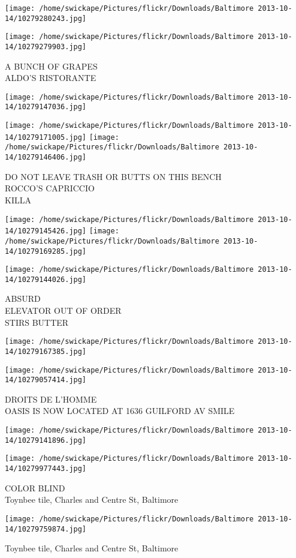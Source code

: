 \documentclass[10pt,letterpaper]{article}
\begin{document}
\texttt{[image: /home/swickape/Pictures/flickr/Downloads/Baltimore 2013-10-14/10279280243.jpg]}

\vspace{0.25in}
\texttt{[image: /home/swickape/Pictures/flickr/Downloads/Baltimore 2013-10-14/10279279903.jpg]}

A BUNCH OF GRAPES\\
ALDO'S RISTORANTE\\
\pagebreak

\texttt{[image: /home/swickape/Pictures/flickr/Downloads/Baltimore 2013-10-14/10279147036.jpg]}

\vspace{0.25in}
\texttt{[image: /home/swickape/Pictures/flickr/Downloads/Baltimore 2013-10-14/10279171005.jpg]}
\texttt{[image: /home/swickape/Pictures/flickr/Downloads/Baltimore 2013-10-14/10279146406.jpg]}

DO NOT LEAVE TRASH OR BUTTS ON THIS BENCH\\
ROCCO'S CAPRICCIO\\
KILLA\\
\pagebreak

\texttt{[image: /home/swickape/Pictures/flickr/Downloads/Baltimore 2013-10-14/10279145426.jpg]}
\texttt{[image: /home/swickape/Pictures/flickr/Downloads/Baltimore 2013-10-14/10279169285.jpg]}

\texttt{[image: /home/swickape/Pictures/flickr/Downloads/Baltimore 2013-10-14/10279144026.jpg]}

ABSURD\\
ELEVATOR OUT OF ORDER\\
STIRS BUTTER\\
\pagebreak

\texttt{[image: /home/swickape/Pictures/flickr/Downloads/Baltimore 2013-10-14/10279167385.jpg]}

\vspace{0.25in}
\texttt{[image: /home/swickape/Pictures/flickr/Downloads/Baltimore 2013-10-14/10279057414.jpg]}

DROITS DE L'HOMME\\
OASIS IS NOW LOCATED AT 1636 GUILFORD AV SMILE\\
\pagebreak

\texttt{[image: /home/swickape/Pictures/flickr/Downloads/Baltimore 2013-10-14/10279141896.jpg]}

\vspace{0.25in}
\texttt{[image: /home/swickape/Pictures/flickr/Downloads/Baltimore 2013-10-14/10279977443.jpg]}

COLOR BLIND\\
Toynbee tile, Charles and Centre St, Baltimore\\
\pagebreak

\texttt{[image: /home/swickape/Pictures/flickr/Downloads/Baltimore 2013-10-14/10279759874.jpg]}

Toynbee tile, Charles and Centre St, Baltimore\\
\pagebreak
\end{document}
